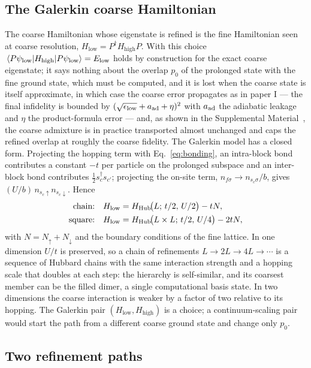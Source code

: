 \documentclass[a4paper,11pt,noarxiv]{quantumarticle}
\newcommand{\Hlow}{H_{\mathrm{low}}}
\newcommand{\Hhigh}{H_{\mathrm{high}}}
\newcommand{\SM}{Supplemental Material~\cite{SM}}
\begin{document}
\subsection{The Galerkin coarse Hamiltonian}
\label{sec:galerkin}
The coarse Hamiltonian whose eigenstate is refined is the fine Hamiltonian
seen at coarse resolution, $\Hlow=P^\dagger\Hhigh P$.  With this choice
$\expval{\Hhigh}{P\psi_{\rm low}}=E_{\rm low}$ holds by construction for the
exact coarse eigenstate; it says nothing about the overlap $p_0$ of the
prolonged state with the fine ground state, which must be computed, and it
is lost when the coarse state is itself approximate, in which case the
coarse error propagates as in paper I --- the final infidelity is bounded by
$(\sqrt{\epsilon_{\rm low}}+a_{\rm ad}+\eta)^2$ with $a_{\rm ad}$ the
adiabatic leakage and $\eta$ the product-formula error --- and, as shown in
the \SM, the coarse admixture is in practice transported almost unchanged
and caps the refined overlap at roughly the coarse fidelity.  The Galerkin
model has a closed form.  Projecting the hopping term with
Eq.~\eqref{eq:bonding}, an intra-block bond contributes a constant $-t$ per
particle on the prolonged subspace and an inter-block bond contributes
$\tfrac12s^\dagger_cs_{c'}$; projecting the on-site term,
$n_{f\sigma}\to n_{s_c\sigma}/b$, gives $(U/b)\,n_{s_c\uparrow}n_{s_c\downarrow}$.
Hence
\begin{align}
  \text{chain:}\quad &\Hlow=H_{\rm Hub}\!\big(L;\,t/2,\,U/2\big)-tN, \label{eq:gal1d}\\
  \text{square:}\quad&\Hlow=H_{\rm Hub}\!\big(L\times L;\,t/2,\,U/4\big)-2tN, \label{eq:gal2d}
\end{align}
with $N=N_\uparrow+N_\downarrow$ and the boundary conditions of the fine
lattice.  In one dimension $U/t$ is preserved, so a chain of refinements
$L\to2L\to4L\to\cdots$ is a sequence of Hubbard chains with the same
interaction strength and a hopping scale that doubles at each step: the
hierarchy is self-similar, and its coarsest member can be the filled dimer,
a single computational basis state.  In two dimensions the coarse
interaction is weaker by a factor of two relative to its hopping.  The
Galerkin pair $(\Hlow,\Hhigh)$ is a choice; a continuum-scaling pair would
start the path from a different coarse ground state and change only $p_0$.

\subsection{Two refinement paths}
\label{sec:paths}
\end{document}

